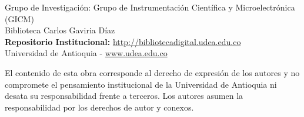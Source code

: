 \begin{titlepage}
    \vspace{1.6cm}
    
    \noindent
    Grupo de Investigación: Grupo de Instrumentación Científica y Microelectrónica (GICM)\\[0.3cm]
    Biblioteca Carlos Gaviria Díaz\\[0.6cm]
    \textbf{Repositorio Institucional:} \url{http://bibliotecadigital.udea.edu.co}\\[0.6cm]
    Universidad de Antioquia - \url{www.udea.edu.co}
    
    \vfill
    
    \noindent\small
    El contenido de esta obra corresponde al derecho de expresión de los autores y no compromete el pensamiento institucional de la Universidad de Antioquia ni desata su responsabilidad frente a terceros. Los autores asumen la responsabilidad por los derechos de autor y conexos.
\end{titlepage}